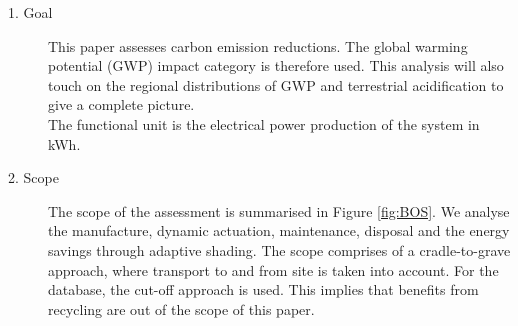 \begin{description}
\item[1. Goal] This paper assesses carbon emission reductions. The global warming potential (GWP) impact category is therefore used. This analysis will also touch on the regional distributions of GWP and terrestrial acidification to give a complete picture.\\
The functional unit is the electrical power production of the system in kWh. 


\item[2. Scope] The scope of the assessment is summarised in Figure \ref{fig:BOS}. We analyse the  manufacture, dynamic actuation, maintenance, disposal and the energy savings through adaptive shading. The scope comprises of a cradle-to-grave approach, where transport to and from site is taken into account. For the database, the cut-off approach is used. This implies that benefits from recycling are out of the scope of this paper.







\end{description}
